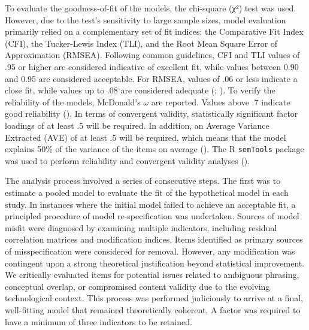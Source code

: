 \documentclass[
  letterpaper,
  DIV=11,
  numbers=noendperiod]{scrartcl}
\begin{document}
To evaluate the goodness-of-fit of the models, the chi-square (χ²) test
was used. However, due to the test's sensitivity to large sample sizes,
model evaluation primarily relied on a complementary set of fit indices:
the Comparative Fit Index (CFI), the Tucker-Lewis Index (TLI), and the
Root Mean Square Error of Approximation (RMSEA). Following common
guidelines, CFI and TLI values of .95 or higher are considered
indicative of excellent fit, while values between 0.90 and 0.95 are
considered acceptable. For RMSEA, values of .06 or less indicate a close
fit, while values up to .08 are considered adequate
(;
). To verify the
reliability of the models, McDonald's \(\omega\) are reported. Values
above .7 indicate good reliability
(). In terms of
convergent validity, statistically significant factor loadings of at
least .5 will be required. In addition, an Average Variance Extracted
(AVE) of at least .5 will be required, which means that the model
explains 50\% of the variance of the items on average
(). The R
\texttt{semTools} package was used to perform reliability and convergent
validity analyses ().

The analysis process involved a series of consecutive steps. The first
was to estimate a pooled model to evaluate the fit of the hypothetical
model in each study. In instances where the initial model failed to
achieve an acceptable fit, a principled procedure of model
re-specification was undertaken. Sources of model misfit were diagnosed
by examining multiple indicators, including residual correlation
matrices and modification indices. Items identified as primary sources
of misspecification were considered for removal. However, any
modification was contingent upon a strong theoretical justification
beyond statistical improvement. We critically evaluated items for
potential issues related to ambiguous phrasing, conceptual overlap, or
compromised content validity due to the evolving technological context.
This process was performed judiciously to arrive at a final,
well-fitting model that remained theoretically coherent. A factor was
required to have a minimum of three indicators to be retained.
\end{document}
